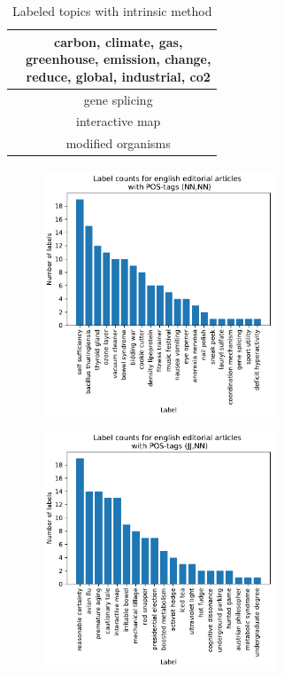 {\begin{table}[h]
\begin{minipage}[t]{0.5\textwidth}
\begin{tabular}{c|c}
			& \thead{carbon, climate, gas,\\ 	greenhouse, emission, change,\\ 	reduce, 	global, 	industrial, 	co2} \\
			\hline
			& gene splicing  \\
			& interactive map   \\
			& modified organisms\\
		\end{tabular}
	\end{minipage}
	\caption[Labeled topics according with intrinsic method]{Labeled topics with intrinsic method}
	\label{tab:intrinsic_label_pos}
\end{table}

\begin{figure}[h]
	\begin{minipage}[t]{0.5\textwidth}
		\includegraphics[width=7cm,height=7.5cm]{gfx/POS-gen1/mit_NN.pdf}
	\end{minipage}
	\begin{minipage}[t]{0.5\textwidth}
		\includegraphics[width=7cm,height=7.5cm]{gfx/POS-gen1/mit_JJNN.pdf}

\end{minipage}
\end{figure}}
